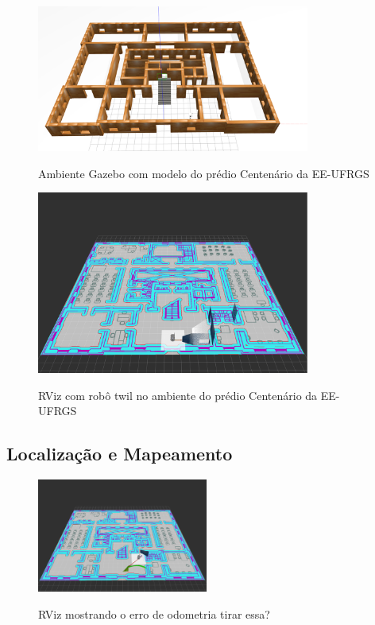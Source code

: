 \documentclass[repeatfields,xlists,xpacks,oneside,yearsonly]{ufrgscca}
\begin{document}
\begin{figure}[htbp]
    {
        \centering
        \caption{Ambiente Gazebo com modelo do prédio Centenário da EE-UFRGS}
        \label{fig:gazebo_centenario}
        \includegraphics[width=0.8\textwidth]{gazebo.png}\\
    }
    {}
\end{figure}

\begin{figure}[htbp]
    {
        \centering
        \caption{RViz com robô twil no ambiente do prédio Centenário da EE-UFRGS}
        \label{fig:rviz_centenario}
        \includegraphics[width=0.8\textwidth]{rviz.png}\\
    }
    {}
\end{figure}

\subsection{Localização e Mapeamento}

\begin{figure}[htbp]
    {
        \centering
        \caption{RViz mostrando o erro de odometria \color{red}tirar essa?}
        \label{fig:erro_odom}
        \includegraphics[width=0.5\textwidth]{erro_de_odometria.png}\\
    }
    {}
\end{figure}
\end{document}
